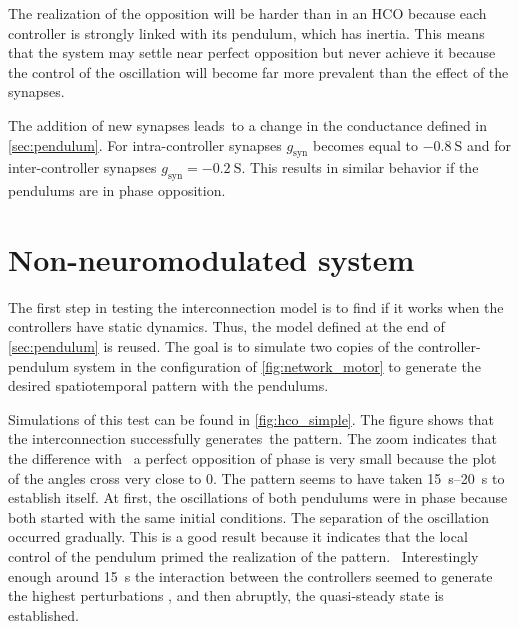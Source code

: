 The realization of the opposition will be harder than in an HCO because each controller is strongly linked with its pendulum, which has inertia.
This means that the system may settle near perfect opposition but never achieve it because the control of the oscillation will become far more prevalent than the effect of the synapses.

The addition of new synapses leads to a change in the conductance defined in \cref{sec:pendulum}.
For intra-controller synapses $g_\text{syn}$ becomes equal to $\qty{-0.8}{\siemens}$ and for inter-controller synapses $g_\text{syn} = \qty{-0.2}{\siemens}$.
This results in similar behavior if the pendulums are in phase opposition.



\section{Non-neuromodulated system}

The first step in testing the interconnection model is to find if it works when the controllers have static dynamics.
Thus, the model defined at the end of \cref{sec:pendulum} is reused.
The goal is to simulate two copies of the controller-pendulum system in the configuration of \cref{fig:network_motor} to generate the desired spatiotemporal pattern with the pendulums.

Simulations of this test can be found in \cref{fig:hco_simple}.
The figure shows that the interconnection successfully generates the pattern.
The zoom indicates that the difference with  a perfect opposition of phase is very small because the plot of the angles cross very close to 0.
The pattern seems to have taken \qtyrange{15}{20}{\second} to establish itself.
At first, the oscillations of both pendulums were in phase because both started with the same initial conditions.
The separation of the oscillation occurred gradually. This is a good result because it indicates that the local control of the pendulum primed the realization of the pattern. 
Interestingly enough around \qty{15}{\second} the interaction between the controllers seemed to generate the highest perturbations , and then abruptly, the quasi-steady state is established.

